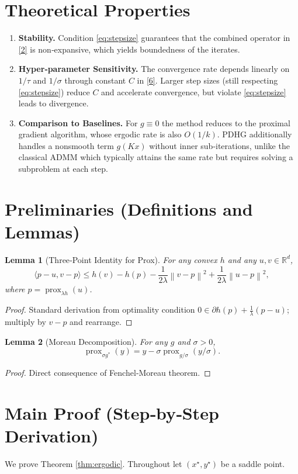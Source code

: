 \documentclass{article}
\newtheorem{lemma}{Lemma}
\newcommand{\prox}{\operatorname{prox}}
\newcommand{\inner}[2]{\langle #1,#2\rangle}
\newcommand{\norm}[1]{\left\|#1\right\|}
\begin{document}
\section*{Theoretical Properties}
\begin{enumerate}
\item \textbf{Stability.} Condition \eqref{eq:stepsize} guarantees that the combined operator in \eqref{2} is non‑expansive, which yields boundedness of the iterates.
\item \textbf{Hyper‑parameter Sensitivity.} The convergence rate depends linearly on $1/\tau$ and $1/\sigma$ through constant $C$ in \eqref{6}. Larger step sizes (still respecting \eqref{eq:stepsize}) reduce $C$ and accelerate convergence, but violate \eqref{eq:stepsize} leads to divergence.
\item \textbf{Comparison to Baselines.} For $g\equiv0$ the method reduces to the proximal gradient algorithm, whose ergodic rate is also $O(1/k)$. PDHG additionally handles a nonsmooth term $g(Kx)$ without inner sub‑iterations, unlike the classical ADMM which typically attains the same rate but requires solving a subproblem at each step.
\end{enumerate}

\section*{Preliminaries (Definitions and Lemmas)}
\begin{lemma}[Three‑Point Identity for Prox]\label{lem:prox}
For any convex $h$ and any $u,v\in\mathbb R^{d}$,
\[
\inner{p-u}{v-p}
\le
h(v)-h(p)-\frac{1}{2\lambda}\norm{v-p}^{2}
+\frac{1}{2\lambda}\norm{u-p}^{2},
\tag{7}
\]
where $p=\prox_{\lambda h}(u)$.
\end{lemma}
\begin{proof}
Standard derivation from optimality condition
$0\in\partial h(p)+\frac{1}{\lambda}(p-u)$; multiply by $v-p$ and rearrange.
\end{proof}

\begin{lemma}[Moreau Decomposition]\label{lem:moreau}
For any $g$ and $\sigma>0$,
\[
\prox_{\sigma g^{*}}(y)=y-\sigma\prox_{g/\sigma}(y/\sigma).
\tag{8}
\]
\end{lemma}
\begin{proof}
Direct consequence of Fenchel‑Moreau theorem.
\end{proof}

\section*{Main Proof (Step‑by‑Step Derivation)}
We prove Theorem \ref{thm:ergodic}.  Throughout let $(x^{\star},y^{\star})$ be a saddle point.
\end{document}
